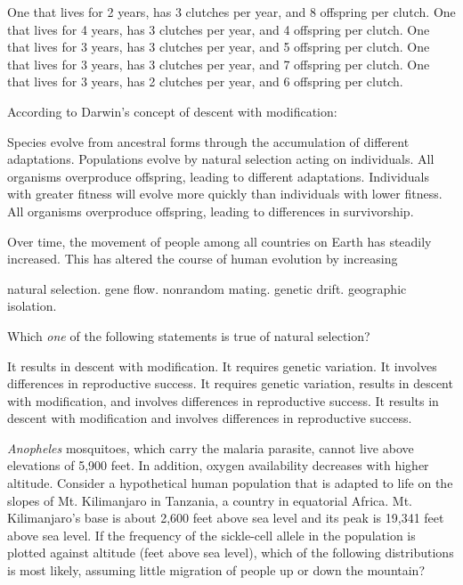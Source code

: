 \begin{choices}
\choice One that lives for 2 years, has 3 clutches per year, and 8 offspring per clutch. 
\choice One that lives for 4 years, has 3 clutches per year, and 4 offspring per clutch.
\choice One that lives for 3 years, has 3 clutches per year, and 5 offspring per clutch.
\correctchoice One that lives for 3 years, has 3 clutches per year, and 7 offspring per clutch. 
\choice One that lives for 3 years, has 2 clutches per year, and 6 offspring per clutch. 
\end{choices}

\question
According to Darwin's concept of descent with modification:

\begin{choices}
\correctchoice Species evolve from ancestral forms through the accumulation of different adaptations. 
\choice Populations evolve by natural selection acting on individuals. 
\choice All organisms overproduce offspring, leading to different adaptations. 
\choice Individuals with greater fitness will evolve more quickly than individuals with lower fitness. 
\choice All organisms overproduce offspring, leading to differences in survivorship. 
\end{choices}

\question
Over time, the movement of people among all countries on Earth has steadily increased. This has altered the course of human evolution by increasing

\begin{choices}
\choice natural selection. 
\correctchoice gene flow. 
\choice nonrandom mating. 
\choice genetic drift. 
\choice geographic isolation. 
\end{choices}

\question
Which \emph{one} of the following statements is true of natural selection?

\begin{choices}
\choice It results in descent with modification. 
\choice It requires genetic variation. 
\choice It involves differences in reproductive success. 
\correctchoice It requires genetic variation, results in descent with modification, and involves differences in reproductive success. 
\choice It results in descent with modification and involves differences in reproductive success. 
\end{choices}

\newpage

\question
\textit{Anopheles} mosquitoes, which carry the malaria parasite, cannot live above elevations of 5,900 feet. In addition, oxygen availability decreases with higher altitude. Consider a hypothetical human population that is adapted to life on the slopes of Mt. Kilimanjaro in Tanzania, a country in equatorial Africa. Mt. Kilimanjaro's base is about 2,600 feet above sea level and its peak is 19,341 feet above sea level. If the frequency of the sickle-cell allele in the population is plotted against altitude (feet above sea level), which of the following distributions is most likely, assuming little migration of people up or down the mountain?


